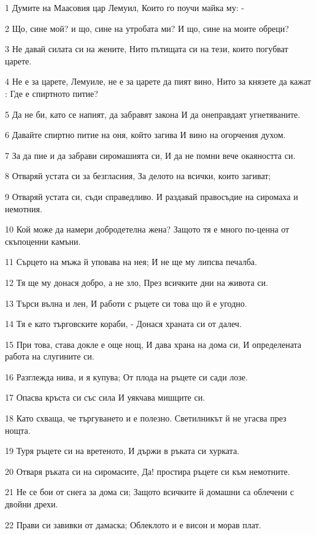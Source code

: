 \par 1 Думите на Маасовия цар Лемуил, Които го поучи майка му: -
\par 2 Що, сине мой? и що, сине на утробата ми? И що, сине на моите обреци?
\par 3 Не давай силата си на жените, Нито пътищата си на тези, които погубват царете.
\par 4 Не е за царете, Лемуиле, не е за царете да пият вино, Нито за князете да кажат : Где е спиртното питие?
\par 5 Да не би, като се напият, да забравят закона И да онеправдаят угнетяваните.
\par 6 Давайте спиртно питие на оня, който загива И вино на огорчения духом.
\par 7 За да пие и да забрави сиромашията си, И да не помни вече окаяността си.
\par 8 Отваряй устата си за безгласния, За делото на всички, които загиват;
\par 9 Отваряй устата си, съди справедливо. И раздавай правосъдие на сиромаха и немотния.
\par 10 Кой може да намери добродетелна жена? Защото тя е много по-ценна от скъпоценни камъни.
\par 11 Сърцето на мъжа й уповава на нея; И не ще му липсва печалба.
\par 12 Тя ще му донася добро, а не зло, През всичките дни на живота си.
\par 13 Търси вълна и лен, И работи с ръцете си това що й е угодно.
\par 14 Тя е като търговските кораби, - Донася храната си от далеч.
\par 15 При това, става докле е още нощ, И дава храна на дома си, И определената работа на слугините си.
\par 16 Разглежда нива, и я купува; От плода на ръцете си сади лозе.
\par 17 Опасва кръста си със сила И уякчава мишците си.
\par 18 Като схваща, че търгуването и е полезно. Светилникът й не угасва през нощта.
\par 19 Туря ръцете си на вретеното, И държи в ръката си хурката.
\par 20 Отваря ръката си на сиромасите, Да! простира ръцете си към немотните.
\par 21 Не се бои от снега за дома си; Защото всичките й домашни са облечени с двойни дрехи.
\par 22 Прави си завивки от дамаска; Облеклото и е висон и морав плат.
